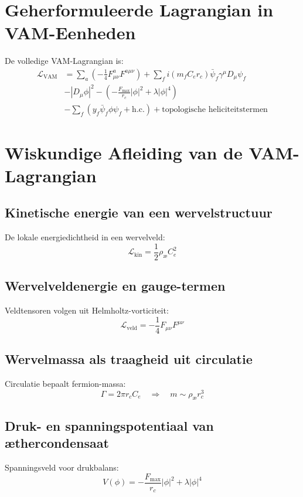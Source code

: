\documentclass{article}
\begin{document}
    \section{Geherformuleerde Lagrangian in VAM-Eenheden}
    De volledige VAM-Lagrangian is:
    \begin{align*}
        \mathcal{L}_\text{VAM} &= \sum_{a}\left(-\frac{1}{4} F^{a}_{\mu\nu} F^{a\mu\nu}\right)
        + \sum_{f} i(m_f C_e r_c)\bar{\psi}_f \gamma^\mu D_\mu \psi_f \\
        &- \left| D_\mu \phi \right|^2
        - \left(-\frac{F_\text{max}}{r_c}|\phi|^2 + \lambda|\phi|^4\right) \\
        &- \sum_f \left(y_f \bar{\psi}_f \phi \psi_f + \text{h.c.}\right)
        + \text{topologische heliciteitstermen}
    \end{align*}

    \section{Wiskundige Afleiding van de VAM-Lagrangian}

    \subsection{Kinetische energie van een wervelstructuur}
    De lokale energiedichtheid in een wervelveld:
    \[
        \mathcal{L}_\text{kin} = \frac{1}{2}\rho_\text{\ae} C_e^2
    \]

    \subsection{Wervelveldenergie en gauge-termen}
    Veldtensoren volgen uit Helmholtz-vorticiteit:
    \[
        \mathcal{L}_\text{veld} = -\frac{1}{4}F_{\mu\nu}F^{\mu\nu}
    \]

    \subsection{Wervelmassa als traagheid uit circulatie}
    Circulatie bepaalt fermion-massa:
    \[
        \Gamma = 2\pi r_c C_e \quad\Rightarrow\quad m \sim \rho_\text{\ae} r_c^3
    \]

    \subsection{Druk- en spanningspotentiaal van æthercondensaat}
    Spanningsveld voor drukbalans:
    \[
        V(\phi) = -\frac{F_\text{max}}{r_c}|\phi|^2 + \lambda|\phi|^4
    \]
\end{document}
